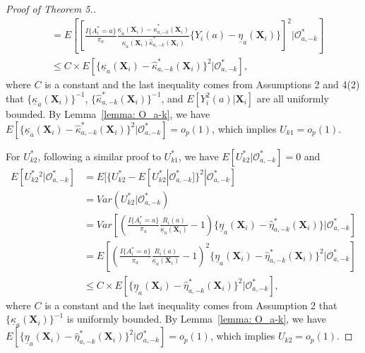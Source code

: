 \documentclass[12pt]{article}
\newcommand{\bX}{\boldsymbol{X}}
\begin{document}
\begin{proof}[Proof of Theorem 5.]
\begin{align*}
    &= E\left[\left[\frac{I\{A_i^*=a\}}{\pi_a} \frac{\underline{\kappa}_a(\bX_i) - \widehat{\kappa}_{a,-k}^*(\bX_i)}{\underline{\kappa}_a(\bX_i)\widehat{\kappa}_{a,-k}^*(\bX_i)}\{Y_i(a) - \underline{\eta}_a(\bX_i)\}\right]^2\bigg|\mathcal{O}^*_{a,-k}\right] \\
    &\le C\times E[\{\underline{\kappa}_a(\bX_i) - \widehat{\kappa}_{a,-k}^*(\bX_i)\}^2|\mathcal{O}^*_{a,-k}],
\end{align*}
where $C$ is a constant and the last inequality comes from  Assumptions 2 and 4(2) that $\{\underline{\kappa}_a(\bX_i)\}^{-1}$, $\{\widehat{\kappa}_{a,-k}^*(\bX_i)\}^{-1}$, and $E[Y_i^2(a)|\bX_i]$ are all uniformly bounded. 
By Lemma~\ref{lemma: O_a-k}, we have $E[\{\underline{\kappa}_a(\bX_i) - \widehat{\kappa}_{a,-k}^*(\bX_i)\}^2|\mathcal{O}^*_{a,-k}] = o_p(1)$, which implies $U_{k1} = o_p(1)$.

For $U_{k2}^*$, following a similar proof to $U_{k1}^*$, we have $E[U_{k2}^*|\mathcal{O}_{a,-k}^*] = 0$ and
\begin{align*}
    E[U_{k2}^*{}^2|\mathcal{O}^*_{a,-k}] &= E[\{U_{k2}^* - E[U_{k2}^*|\mathcal{O}_{a,-k}^*]\}^2|\mathcal{O}^*_{a,-k}] \\
    &= Var(U_{k2}^*|\mathcal{O}^*_{a,-k}) \\
    &= Var\left[\left(\frac{I\{A_i^*=a\}}{\pi_a} \frac{R_i(a)}{\underline{\kappa}_a(\bX_i)}-1\right)  \{\underline{\eta}_a(\bX_i)-\widehat{\eta}_{a,-k}^*(\bX_i)\}\bigg|\mathcal{O}^*_{a,-k}\right] \\
    &= E\left[\left(\frac{I\{A_i^*=a\}}{\pi_a} \frac{R_i(a)}{\underline{\kappa}_a(\bX_i)}-1\right)^2  \{\underline{\eta}_a(\bX_i)-\widehat{\eta}_{a,-k}^*(\bX_i)\}^2\bigg|\mathcal{O}^*_{a,-k}\right] \\
    &\le C\times E[\{\underline{\eta}_a(\bX_i)-\widehat{\eta}_{a,-k}^*(\bX_i)\}^2|\mathcal{O}^*_{a,-k}],
\end{align*}
where $C$ is a constant and the last inequality comes from Assumption 2 that $\{\underline{\kappa}_a(\bX_i)\}^{-1}$ is uniformly bounded. 
By Lemma~\ref{lemma: O_a-k}, we have $E[\{\underline{\eta}_a(\bX_i) - \widehat{\eta}_{a,-k}^*(\bX_i)\}^2|\mathcal{O}^*_{a,-k}] = o_p(1)$, which implies $U_{k2} = o_p(1)$.


\end{proof}
\end{document}
